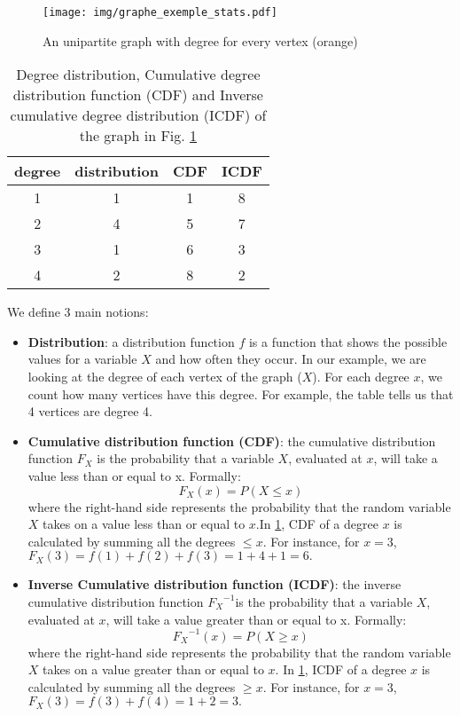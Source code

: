 \documentclass[table]{report}
\begin{document}
\begin{figure}[h]%
\centering
\texttt{[image: img/graphe\_exemple\_stats.pdf]}
\caption{An unipartite graph with degree for every vertex (orange)}
\label{fig:graphe_exemple_stats}
\end{figure}
\FloatBarrier


\begin{table}[h]
\centering
\begin{tabular}{cccc}
\hline
degree & distribution & CDF & ICDF \\ \hline
1      & 1     & 1   & 8    \\
2      & 4     & 5   & 7    \\
3      & 1     & 6   & 3    \\
4      & 2     & 8   & 2    \\ \hline
\end{tabular}
\caption{Degree distribution, Cumulative degree distribution function (CDF) and Inverse cumulative degree distribution (ICDF) of the graph in Fig. \ref{fig:graphe_exemple_stats}}
\label{tab:my-table}
\end{table}

\noindent
We define 3 main notions:
\begin{itemize}[noitemsep]
    \item \textbf{Distribution}: a distribution function $f$ is a function that shows the possible values for a variable $X$ and how often they occur. In our example, we are looking at the degree of each vertex of the graph ($X$). For each degree $x$, we count how many vertices have this degree. For example, the table tells us that 4 vertices are degree 4.
    \item \textbf{Cumulative distribution function (CDF)}: the cumulative distribution function $F_X$ is the probability that a variable $X$, evaluated at $x$, will take a value less than or equal to x. Formally:
$$F_X(x) = P(X \leq x)$$ 
where the right-hand side represents the probability that the random variable $X$ takes on a value less than or equal to $x$.In \ref{tab:my-table}, CDF of a degree $x$ is calculated by summing all the degrees $\leq x$. For instance, for $x=3$, $F_X(3) = f(1)+f(2)+f(3)=1+4+1=6. $


    \item \textbf{Inverse Cumulative distribution function (ICDF)}: the inverse cumulative distribution function ${F_X}^{-1}$is the probability that a variable $X$, evaluated at $x$, will take a value greater than or equal to x. Formally:
$${F_X}^{-1}(x) = P(X \geq x)$$ 
where the right-hand side represents the probability that the random variable $X$ takes on a value greater than or equal to $x$. In \ref{tab:my-table}, ICDF of a degree $x$ is calculated by summing all the degrees $\geq x$. For instance, for $x=3$, $F_X(3) = f(3)+f(4)=1+2=3.$
\end{itemize}
\end{document}

